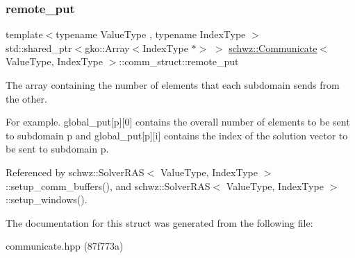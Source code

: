\subsubsection{\texorpdfstring{remote\+\_\+put}{remote\_put}}
{\footnotesize\ttfamily template$<$typename Value\+Type , typename Index\+Type $>$ \\
std\+::shared\+\_\+ptr$<$gko\+::\+Array$<$Index\+Type $\ast$$>$ $>$ \hyperlink{classschwz_1_1Communicate}{schwz\+::\+Communicate}$<$ Value\+Type, Index\+Type $>$\+::comm\+\_\+struct\+::remote\+\_\+put}



The array containing the number of elements that each subdomain sends from the other. 

For example. global\+\_\+put\mbox{[}p\mbox{]}\mbox{[}0\mbox{]} contains the overall number of elements to be sent to subdomain p and global\+\_\+put\mbox{[}p\mbox{]}\mbox{[}i\mbox{]} contains the index of the solution vector to be sent to subdomain p. 

Referenced by schwz\+::\+Solver\+R\+A\+S$<$ Value\+Type, Index\+Type $>$\+::setup\+\_\+comm\+\_\+buffers(), and schwz\+::\+Solver\+R\+A\+S$<$ Value\+Type, Index\+Type $>$\+::setup\+\_\+windows().



The documentation for this struct was generated from the following file\+:\begin{DoxyCompactItemize}
\item 
communicate.\+hpp (87f773a)\end{DoxyCompactItemize}

